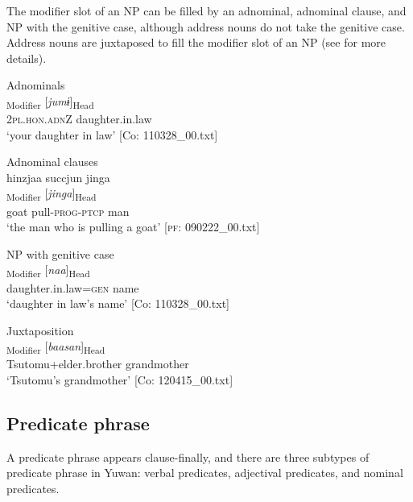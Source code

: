 The modifier slot of an NP can be filled by an adnominal, adnominal clause, and NP with the genitive case, although address nouns do not take the genitive case. Address nouns are juxtaposed to fill the modifier slot of an NP (see  for more details).

\ea\label{ex:4.3} 
\ea Adnominals\label{ex:4.3a}\\
 \textsubscript{Modifier}  [\textit{jumɨ}]\textsubscript{Head}\\
      2\textsc{pl}.\textsc{hon}.\textsc{adn}Z  daughter.in.law\\
      \glt ‘your daughter in law’   [Co: 110328\_00.txt]

\ex\label{ex:4.3b} Adnominal clauses\\
\glll      hinzjaa  succjun  jinga\\
      [\textit{hinzjaa}  \textit{sukk-tur-n}]\textsubscript{Modifier}  [\textit{jinga}]\textsubscript{Head}\\
      goat  pull-\textsc{prog}-\textsc{ptcp}  man\\
      \glt       ‘the man who is pulling a goat’ [\textsc{pf}: 090222\_00.txt]

\ex\label{ex:4.3c}  NP with genitive case\\
    \gll  [\textit{jumɨ=nu}]\textsubscript{Modifier}  [\textit{naa}]\textsubscript{Head}\\
      daughter.in.law=\textsc{gen}  name\\
      \glt       ‘daughter in law’s name’ [Co: 110328\_00.txt]

\ex\label{ex:4.3d} Juxtaposition\\
    \textsubscript{Modifier}  [\textit{baasan}]\textsubscript{Head}\\
      Tsutomu+elder.brother  grandmother\\
      \glt       ‘Tsutomu’s grandmother’ [Co: 120415\_00.txt]
\z
\z

\subsection{Predicate phrase}\label{sec:4.1.3}

A predicate phrase appears clause-finally, and there are three subtypes of predicate phrase in Yuwan: verbal predicates, adjectival predicates, and nominal predicates.

